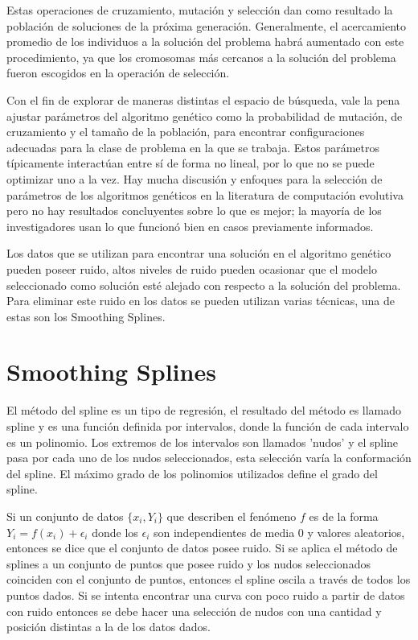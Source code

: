Estas operaciones de cruzamiento, mutación y selección dan como resultado la población de soluciones de la próxima generación. Generalmente, el acercamiento promedio de los individuos a la solución del problema habrá aumentado con este procedimiento, ya que los cromosomas más cercanos a la solución del problema fueron escogidos en la operación de selección.

Con el fin de explorar de maneras distintas el espacio de búsqueda, vale la pena ajustar parámetros del algoritmo genético como la probabilidad de mutación, de cruzamiento y el tamaño de la población, para encontrar configuraciones adecuadas para la clase de problema en la que se trabaja. Estos parámetros típicamente interactúan entre sí de forma no lineal, por lo que no se puede optimizar uno a la vez. Hay mucha discusión y enfoques para la selección de parámetros de los algoritmos genéticos en la literatura de computación evolutiva pero no hay resultados concluyentes sobre lo que es mejor; la mayoría de los investigadores usan lo que funcionó bien en casos previamente informados. \cite{mitchell1998introduction}

Los datos que se utilizan para encontrar una solución en el algoritmo genético pueden poseer ruido, altos niveles de ruido pueden ocasionar que el modelo seleccionado como solución esté alejado con respecto a la solución del problema. Para eliminar este ruido en los datos se pueden utilizan varias técnicas, una de estas son los Smoothing Splines.

\section{Smoothing Splines}

El método del spline es un tipo de regresión, el resultado del método es llamado spline y es una función definida por intervalos, donde la función de cada intervalo es un polinomio. Los extremos de los intervalos son llamados 'nudos' y el spline pasa por cada uno de los nudos seleccionados, esta selección varía la conformación del spline. El máximo grado de los polinomios utilizados define el grado del spline.

Si un conjunto de datos $\{x_i, Y_i\}$ que describen el fenómeno $f$ es de la forma $Y_i = f(x_i) + \epsilon_i$ donde los $\epsilon_i$ son independientes de media 0 y valores aleatorios, entonces se dice que el conjunto de datos posee ruido. Si se aplica el método de splines a un conjunto de puntos que posee ruido y los nudos seleccionados coinciden con el conjunto de puntos, entonces el spline oscila a través de todos los puntos dados. Si se intenta encontrar una curva con poco ruido a partir de datos con ruido entonces se debe hacer una selección de nudos con una cantidad y posición distintas a la de los datos dados.

